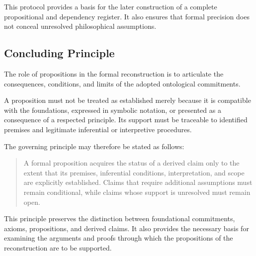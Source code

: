 This protocol provides a basis for the later construction
of a complete propositional and dependency register. It also
ensures that formal precision does not conceal unresolved
philosophical assumptions.

\subsection{Concluding Principle}

The role of propositions in the formal reconstruction is
to articulate the consequences, conditions, and limits of
the adopted ontological commitments.

A proposition must not be treated as established merely
because it is compatible with the foundations, expressed
in symbolic notation, or presented as a consequence of
a respected principle. Its support must be traceable to
identified premises and legitimate inferential or
interpretive procedures.

The governing principle may therefore be stated as follows:

\begin{quote}
A formal proposition acquires the status of a derived claim
only to the extent that its premises, inferential conditions,
interpretation, and scope are explicitly established. Claims
that require additional assumptions must remain conditional,
while claims whose support is unresolved must remain open.
\end{quote}

This principle preserves the distinction between foundational
commitments, axioms, propositions, and derived claims. It
also provides the necessary basis for examining the arguments
and proofs through which the propositions of the reconstruction
are to be supported.

